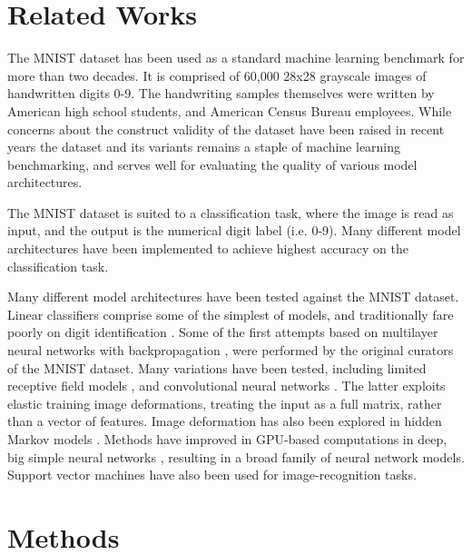 \documentclass{article}
\begin{document}
\section{Related Works}

The MNIST dataset \citep{bottouComparisonClassifierMethods1994, HandwrittenDigitDatabase}
has been used as a standard machine learning benchmark
for more than two decades.
It is comprised of 60,000 28x28 grayscale images of handwritten digits 0-9.
The handwriting samples themselves were written by American high school students,
and American Census Bureau employees.
While concerns about the construct validity of the dataset have been raised in recent years \citep{yadavColdCaseLost2019}
the dataset and its variants remains a staple of machine learning benchmarking,
and serves well for evaluating the quality of various model architectures.

The MNIST dataset is suited to a classification task,
where the image is read as input, and the output is the numerical digit label (i.e. 0-9).
Many different model architectures have been implemented to achieve highest accuracy on the classification task.

Many different model architectures have been tested against the MNIST dataset.
Linear classifiers comprise some of the simplest of models, and traditionally fare poorly on digit identification
\citep{bottouComparisonClassifierMethods1994}.
Some of the first attempts based on multilayer neural networks with backpropagation \citep{bottouComparisonClassifierMethods1994, lecunGradientbasedLearningApplied1998},
were performed by the original curators of the MNIST dataset.
Many variations have been tested, including limited receptive field models \citep{kussulImprovedMethodHandwritten2004},
and convolutional neural networks \citep{simardBestPracticesConvolutional2003}.
The latter exploits elastic training image deformations, treating the input as a full matrix,
rather than a vector of features.
Image deformation has also been explored in hidden Markov models \citep{keysersDeformationModelsImage2007}.
Methods have improved in GPU-based computations in deep, big simple neural networks
\citep{ciresanDeepBigSimple2010, ciresanMulticolumnDeepNeural2012},
resulting in a broad family of neural network models.
Support vector machines \citep{decosteTrainingInvariantSupport2002} have also been used for image-recognition tasks.

\section{Methods}
\end{document}
